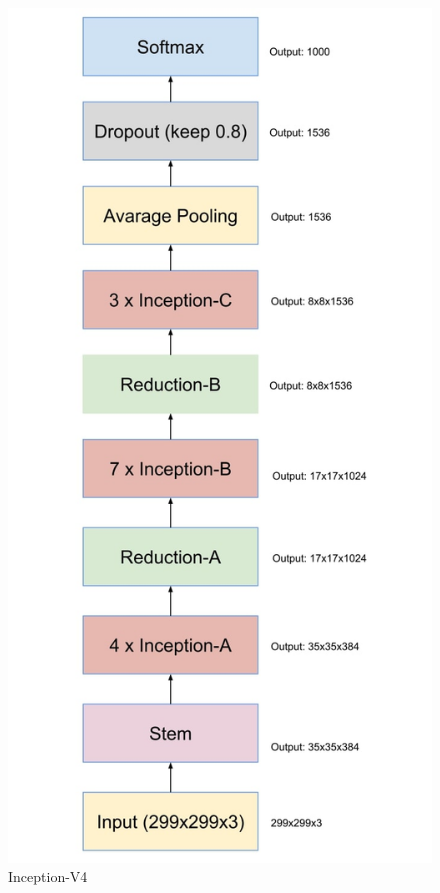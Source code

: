 \documentclass[titlepage]{report}
\begin{document}
\begin{figure}[h!]
    \centering
    \includegraphics[scale=0.3]{inception_v4}
    \caption{Inception-V4}
    \label{fig:inception_v4}
\end{figure}
\end{document}
